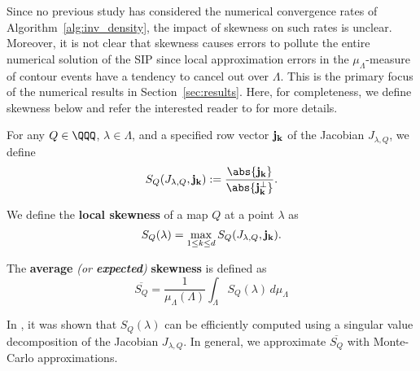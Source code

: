 Since no previous study has considered the numerical convergence rates of Algorithm~\ref{alg:inv_density}, the impact of skewness on such rates is unclear.
Moreover, it is not clear that skewness causes errors to pollute the entire numerical solution of the SIP since local approximation errors in the $\mu_\Lambda$-measure of contour events have a tendency to cancel out over $\Lambda$. 
This is the primary focus of the numerical results in Section~\ref{sec:results}. 
Here, for completeness, we define skewness below and refer the interested reader to \cite{BGE+15, BPW17} for more details.


\begin{defn}
For any $Q\in\QQQ$, $\lambda \in \Lambda$, and a specified row vector $\bf{j}_k$ of the Jacobian $J_{\lambda, Q}$, we define
\begin{equation}
S_Q(J_{\lambda,Q}, \bf{j}_k) := \frac{\abs{\bf{j}_k} }{\abs{\bf{j}_k^\perp}}.
\label{eq:skewness}
\end{equation}

We define the \textbf{local skewness} of a map $Q$ at a point $\lambda$ as 
\begin{equation}
S_Q(\lambda) = \max_{1\leq k \leq d} S_Q(J_{\lambda,Q}, \bf{j}_k).
\label{eq:localskewness}
\end{equation}
\end{defn}

\begin{defn}
The \textbf{average} \emph{(or \textbf{expected})} \textbf{skewness} is defined as
\begin{equation}
\overline{S_Q} = \frac{1}{\mu_{\Lambda}(\Lambda)} \int_\Lambda S_Q (\lambda) \, d\mu_{\Lambda}
\label{eq:avgskew}
\end{equation}
\end{defn}

In \cite{BPW17}, it was shown that $S_Q(\lambda)$ can be efficiently computed using a singular value decomposition of the Jacobian $J_{\lambda,Q}$. 
In general, we approximate $\overline{S_Q}$ with Monte-Carlo approximations.



